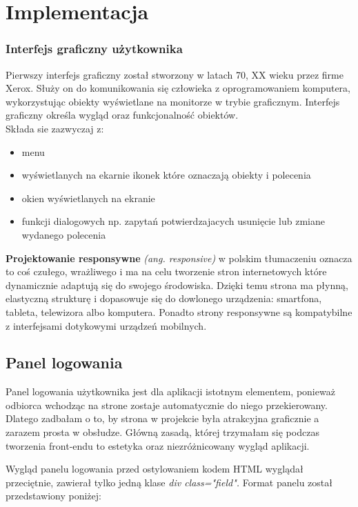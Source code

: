 \documentclass[openright]{xmgr}
\begin{document}
	\chapter{Implementacja}
	\subsection{Interfejs graficzny użytkownika}
	Pierwszy interfejs graficzny został stworzony w latach 70, XX wieku przez firme Xerox. Służy on do komunikowania się człowieka z oprogramowaniem komputera, wykorzystując obiekty wyświetlane na monitorze w trybie graficznym. Interfejs graficzny określa wygląd oraz funkcjonalność obiektów. \\

Składa sie zazwyczaj z:\\
	
\begin{itemize}
	\item
	menu
	
	\item
	 wyświetlanych na ekarnie ikonek które oznaczają obiekty i polecenia
	
	\item
	okien wyświetlanych na ekranie
	\item
	funkcji dialogowych np. zapytań potwierdzajacych usunięcie lub zmiane wydanego polecenia
\end{itemize}
	
	\textbf{Projektowanie responsywne} \textit{(ang. responsive)} w polskim tłumaczeniu oznacza to coś czułego, wrażliwego i ma na celu tworzenie stron internetowych które dynamicznie adaptują się do swojego środowiska. Dzięki temu strona ma płynną, elastyczną strukturę i dopasowuje się do dowlonego urządzenia: smartfona, tableta, telewizora albo komputera. Ponadto strony responsywne są kompatybilne z interfejsami dotykowymi urządzeń mobilnych. 
	\newpage
	\section{Panel logowania}
	
	Panel logowania użytkownika jest dla aplikacji istotnym elementem, ponieważ odbiorca wchodząc na strone zostaje automatycznie do niego przekierowany. Dlatego zadbałam o to, by strona w projekcie była atrakcyjna graficznie a zarazem prosta w obsłudze. Główną zasadą, której trzymałam się podczas tworzenia front-endu to estetyka oraz niezróżnicowany wygląd aplikacji.  
	
	Wygląd panelu logowania przed ostylowaniem kodem HTML wyglądał przeciętnie, zawierał tylko jedną klase \textit{div class="field".} Format panelu został przedstawiony poniżej:
	
\end{document}
